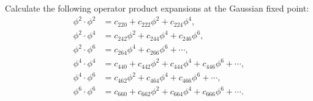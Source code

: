 \documentclass[11pt,a4paper]{article}
\newcounter{problem}
\begin{document}
	\begin{problembox}
		Calculate the following operator product expansions at the Gaussian fixed point:
		\begin{align}
			\phi^2\cdot\phi^2 &= c_{220}+c_{222}\phi^2+c_{224}\phi^4,\\
			\phi^2\cdot\phi^4 &= c_{242}\phi^2+c_{244}\phi^4+c_{246}\phi^6,\\
			\phi^2\cdot\phi^6 &= c_{264}\phi^4+c_{266}\phi^6+\cdots,\\
			\phi^4\cdot\phi^4 &= c_{440}+c_{442}\phi^2+c_{444}\phi^4+c_{446}\phi^6+\cdots,\\
			\phi^4\cdot\phi^6 &= c_{462}\phi^2+c_{464}\phi^4+c_{466}\phi^6+\cdots,\\
			\phi^6\cdot\phi^6 &= c_{660}+c_{662}\phi^2+c_{664}\phi^4+c_{666}\phi^6+\cdots.
		\end{align}
	\end{problembox}
\end{document}
